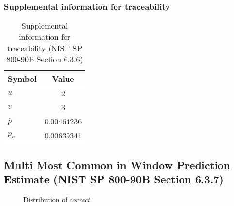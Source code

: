 \documentclass[a3paper,xelatex,english]{bxjsarticle}
\begin{document}
\subsubsection{Supplemental information for traceability}
\renewcommand{\arraystretch}{1.8}
\begin{table}[h]
\caption{Supplemental information for traceability (NIST SP 800-90B Section 6.3.6)}
\begin{center}
\begin{tabular}{|l|c|}
\hline 
\rowcolor{anotherlightblue} %
Symbol				& Value \\ \hline 
$u$				&        2\\ \hline 
$v$				&        3\\ \hline 
$\hat{p}$ 			& 0.00464236\\ \hline
$p_u$				& 0.00639341\\ \hline
\end{tabular}
\end{center}
\end{table}
\renewcommand{\arraystretch}{1.4}
\clearpage
\subsection{Multi Most Common in Window Prediction Estimate (NIST SP 800-90B Section 6.3.7)}
\begin{figure}[htbp]
\centering

\caption{Distribution of $correct$}
\end{figure}
\end{document}
